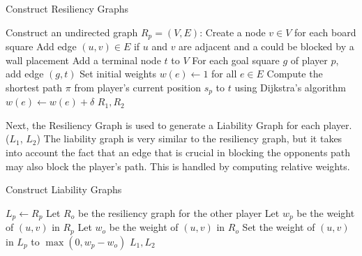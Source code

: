\documentclass[10pt]{article}
\begin{document}
\begin{algorithm}
\caption{Construct Resiliency Graphs}
\begin{algorithmic}[1]
    \State Construct an undirected graph $R_p = (V, E)$:
    \State \hspace{1em} Create a node $v \in V$ for each board square
    \State \hspace{1em} Add edge $(u, v) \in E$ if $u$ and $v$ are adjacent and a could be blocked by a wall placement
    \State \hspace{1em} Add a terminal node $t$ to $V$
    \State \hspace{1em} For each goal square $g$ of player $p$, add edge $(g, t)$
    \State \hspace{1em} Set initial weights $w(e) \gets 1$ for all $e \in E$
        \State Compute the shortest path $\pi$ from player’s current position $s_p$ to $t$ using Dijkstra's algorithm
            \State $w(e) \gets w(e) + \delta$
        \EndFor
    \EndFor
\EndFor
\State \Return $R_1, R_2$
\end{algorithmic}
\end{algorithm}

Next, the Resiliency Graph is used to generate a Liability Graph for each player. ($L_1$, $L_2$) The liability graph is very similar to the resiliency graph, but it takes into account the fact that an edge that is crucial in blocking the opponents path may also block the player's path. This is handled by computing relative weights.  

\begin{algorithm}
\caption{Construct Liability Graphs}
\begin{algorithmic}[1]
    \State $L_p \gets R_p$
    \State Let $R_o$ be the resiliency graph for the other player
        \State Let $w_p$ be the weight of $(u, v)$ in $R_p$
        \State Let $w_o$ be the weight of $(u, v)$ in $R_o$
        \State Set the weight of $(u, v)$ in $L_p$ to $\max(0, w_p - w_o)$
    \EndFor
\EndFor
\State \Return $L_1, L_2$
\end{algorithmic}
\end{algorithm}
\end{document}
